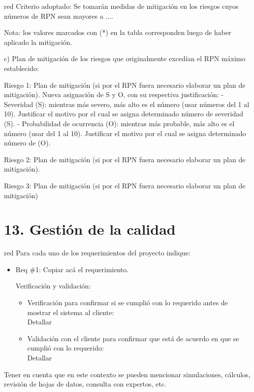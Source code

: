 \documentclass[11pt]{charter}
\begin{document}
\begin{consigna}{red}
Criterio adoptado: 
Se tomarán medidas de mitigación en los riesgos cuyos números de RPN sean mayores a ....

Nota: los valores marcados con (*) en la tabla corresponden luego de haber aplicado la mitigación.

c) Plan de mitigación de los riesgos que originalmente excedían el RPN máximo establecido:
 
Riesgo 1: Plan de mitigación (si por el RPN fuera necesario elaborar un plan de mitigación).
  Nueva asignación de S y O, con su respectiva justificación:
  - Severidad (S): mientras más severo, más alto es el número (usar números del 1 al 10).
          Justificar el motivo por el cual se asigna determinado número de severidad (S).
  - Probabilidad de ocurrencia (O): mientras más probable, más alto es el número (usar del 1 al 10).
          Justificar el motivo por el cual se asigna determinado número de (O).

Riesgo 2: Plan de mitigación (si por el RPN fuera necesario elaborar un plan de mitigación).
 
Riesgo 3: Plan de mitigación (si por el RPN fuera necesario elaborar un plan de mitigación)

\end{consigna}


\section{13. Gestión de la calidad}
\label{sec:calidad}

\begin{consigna}{red}
Para cada uno de los requerimientos del proyecto indique:
\begin{itemize} 
\item Req \#1: Copiar acá el requerimiento.

Verificación y validación:

\begin{itemize}
\item Verificación para confirmar si se cumplió con lo requerido antes de mostrar el sistema al cliente:\\
Detallar 
\item Validación con el cliente para confirmar que está de acuerdo en que se cumplió con lo requerido:\\
Detallar  
\end{itemize}

\end{itemize}

Tener en cuenta que en este contexto se pueden mencionar simulaciones, cálculos, revisión de hojas de datos, consulta con expertos, etc.

\end{consigna}
\end{document}
